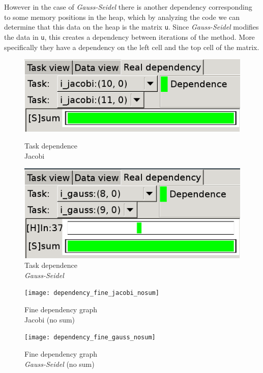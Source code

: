 However in the case of \emph{Gauss-Seidel} there is another dependency corresponding to some
memory positions in the heap, which by analyzing the code we can determine that this
data on the heap is the matrix \texttt{u}. Since \emph{Gauss-Seidel} modifies the data in
\texttt{u}, this creates a dependency between iterations of the method. More specifically
they have a dependency on the left cell and the top cell of the matrix.

\begin{figure}[H]
    \begin{minipage}{0.5\textwidth}
        \centering
        \includegraphics[width=0.9\linewidth]{dependence_jacobi}
        \caption{Task dependence \\ Jacobi}%
        \label{fig:dependence_jacobi}
    \end{minipage}
    \begin{minipage}{0.5\textwidth}
        \centering
        \includegraphics[width=0.9\linewidth]{dependence_gauss}
        \caption{Task dependence \\ \emph{Gauss-Seidel}}%
        \label{fig:dependence_gauss}
    \end{minipage}
\end{figure}

\begin{figure}[H]
    \begin{minipage}{0.5\textwidth}
        \centering
        \texttt{[image: dependency\_fine\_jacobi\_nosum]}
        \caption{Fine dependency graph \\ Jacobi (no sum)}%
        \label{fig:dependency_fine_jacobi_nosum}
    \end{minipage}
    \begin{minipage}{0.5\textwidth}
        \centering
        \texttt{[image: dependency\_fine\_gauss\_nosum]}
        \caption{Fine dependency graph \\ \emph{Gauss-Seidel} (no sum)}%
        \label{fig:dependency_fine_gauss_nosum}
    \end{minipage}
\end{figure}

